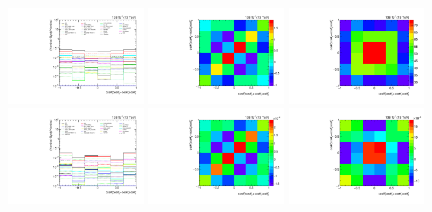 \begin{figure}[htb]
\begin{center}
 \includegraphics[width=0.32\textwidth]{fig_fullRun2UL/unfolding/combined/deltaSystCombinedlog_rebinnedB_c_Pnr.pdf}
 \includegraphics[width=0.32\textwidth]{fig_fullRun2UL/unfolding/combined/StatCovMatrix_rebinnedB_c_Pnr.pdf}
 \includegraphics[width=0.32\textwidth]{fig_fullRun2UL/unfolding/combined/TotalSystCovMatrix_rebinnedB_c_Pnr.pdf} \\
 \includegraphics[width=0.32\textwidth]{fig_fullRun2UL/unfolding/combined/deltaSystCombinedlogNorm_rebinnedB_c_Pnr.pdf}
 \includegraphics[width=0.32\textwidth]{fig_fullRun2UL/unfolding/combined/StatCovMatrixNorm_rebinnedB_c_Pnr.pdf}
 \includegraphics[width=0.32\textwidth]{fig_fullRun2UL/unfolding/combined/TotalSystCovMatrixNorm_rebinnedB_c_Pnr.pdf} \\

\end{center}
\end{figure}

